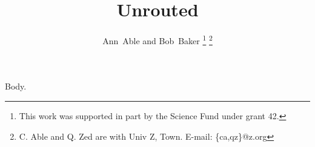 \documentclass[journal]{IEEEtran}
\begin{document}
\title{Unrouted}
\author{Ann~Able and Bob~Baker%
\thanks{This work was supported in part by the Science Fund under grant 42.}
\thanks{C. Able and Q. Zed are with Univ Z, Town. E-mail: \{ca,qz\}@z.org}}
\maketitle
Body.
\end{document}
